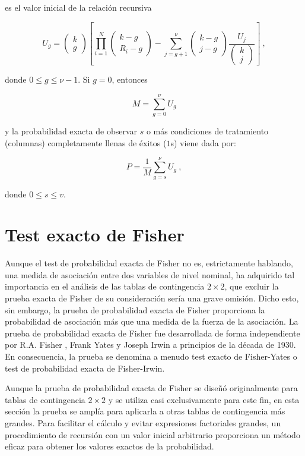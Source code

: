 \documentclass[12pt,a4paper,]{book}
\numberwithin{dummy}{section}
\theoremstyle{ocrenumbox}
\theoremstyle{blacknumex}
\theoremstyle{blacknumbox}
\theoremstyle{ocrenum}
\theoremstyle{ocrenum}
\begin{document}
es el valor inicial de la relación recursiva

\[
U_g=\left(\begin{array}{c}k\\ g\end{array}\right)[\prod_{i=1}^N\left(\begin{array}{c}k-g\\ R_i-g\end{array}\right)-\sum_{j=g+1}^\nu\left(\begin{array}{c}k-g\\ j-g\end{array}\right)\frac{U_j}{\left(\begin{array}{c}k\\ j\end{array}\right)}] ~,
\]

donde \(0 \le g \le \nu - 1\). Si \(g = 0\), entonces

\[
M=\sum_{g=0}^\nu U_g
\]

y la probabilidad exacta de observar \(s\) o más condiciones de
tratamiento (columnas) completamente llenas de éxitos (\(1\)s) viene
dada por:

\[
P=\frac{1}{M}\sum_{g=s}^\nu U_g~,
\]

donde \(0\le s \le v\).

\hypertarget{test-exacto-de-fisher}{%
\section{Test exacto de Fisher}\label{test-exacto-de-fisher}}

Aunque el test de probabilidad exacta de Fisher no es, estrictamente
hablando, una medida de asociación entre dos variables de nivel nominal,
ha adquirido tal importancia en el análisis de las tablas de
contingencia \(2\times2\), que excluir la prueba exacta de Fisher de su
consideración sería una grave omisión. Dicho esto, sin embargo, la
prueba de probabilidad exacta de Fisher proporciona la probabilidad de
asociación más que una medida de la fuerza de la asociación. La prueba
de probabilidad exacta de Fisher fue desarrollada de forma independiente
por R.A. Fisher \citep{Fisher1935}, Frank Yates \citep{Yates1934} y
Joseph Irwin \citep{Irwin1935} a principios de la década de 1930. En
consecuencia, la prueba se denomina a menudo test exacto de Fisher-Yates
o test de probabilidad exacta de Fisher-Irwin.

Aunque la prueba de probabilidad exacta de Fisher se diseñó
originalmente para tablas de contingencia \(2\times2\) y se utiliza casi
exclusivamente para este fin, en esta sección la prueba se amplía para
aplicarla a otras tablas de contingencia más grandes. Para facilitar el
cálculo y evitar expresiones factoriales grandes, un procedimiento de
recursión con un valor inicial arbitrario proporciona un método eficaz
para obtener los valores exactos de la probabilidad.
\end{document}
